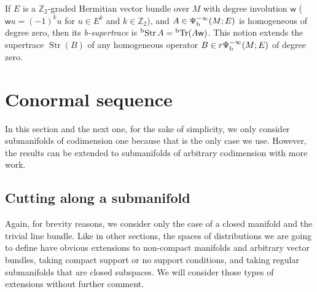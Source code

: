 \documentclass{memo-l}
\theoremstyle{plain}
\theoremstyle{definition}
\theoremstyle{remark}
\newcommand{\Z}{\mathbb{Z}}
\newcommand{\sw}{\mathsf{w}}
\newcommand{\Tr}{\operatorname{Tr}}
\newcommand{\bTr}{{}^{\text{\rm b}}\!\Tr}
\newcommand{\Str}{\operatorname{Str}}
\newcommand{\bStr}{{}^{\text{\rm b}}\!\Str}
\numberwithin{section}{chapter}
\numberwithin{equation}{section}%
\begin{document}
If $E$ is a $\Z_2$-graded Hermitian vector bundle over $M$ with degree involution $\sw$ ($\sw u=(-1)^ku$ for $u\in E^k$ and $k\in\Z_2$), and $A\in\Psi^{-\infty}_{\text{\rm b}}(M;E)$ is homogeneous of degree zero, then its \emph{b-supertrace} is $\bStr A=\bTr(A\sw)$.  \index{$\bStr$} This notion extends the supertrace $\Str(B)$ of any homogeneous operator $B\in r\Psi^{-\infty}_{\text{\rm b}}(M;E)$ of degree zero. \index{$\Str$}



\section{Conormal sequence}\label{s: conormal seq}

In this section and the next one, for the sake of simplicity, we only consider submanifolds of codimension one because that is the only case we use. However, the results can be extended to submanifolds of arbitrary codimension with more work.

\subsection{Cutting along a submanifold}\label{ss: cutting}

Again, for brevity reasons, we consider only the case of a closed manifold and the trivial line bundle. Like in other sections, the spaces of distributions we are going to define have obvious extensions to non-compact manifolds and arbitrary vector bundles, taking compact support or no support conditions, and taking regular submanifolds that are closed subspaces. We will consider those types of extensions without further comment.
\end{document}
